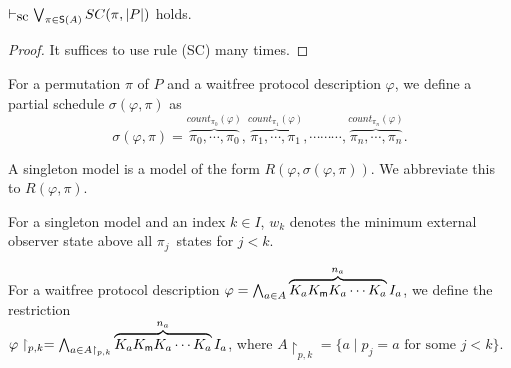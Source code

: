 \begin{lemma}
 \label{perm}
 $\vdash_{\mbox{\rm sc}} \bigvee_{\pi\in \mathsf S(A)} SC(\pi, |P|)$ holds.
\end{lemma}
\begin{proof}
 It suffices to use rule (SC) many times.
\end{proof}

\begin{definition}
 For a permutation $\pi$ of $P$ and a waitfree protocol description $\varphi$, we
 define a partial schedule $\sigma(\varphi, \pi)$ as
\[
 \sigma(\varphi, \pi) = 
 \overbrace{\pi_0, \cdots, \pi_0}^{count_{\pi_0}(\varphi)},
 \overbrace{\pi_1, \cdots, \pi_1}^{count_{\pi_1}(\varphi)},
 \cdots \cdots
 \cdots,
 \overbrace{\pi_n,\cdots, \pi_n}^{count_{\pi_n}(\varphi)}.
\]
\end{definition}

\begin{definition}
 A singleton model is a model of the form $R(\varphi, \sigma(\varphi,
 \pi))$. We abbreviate this to $R(\varphi, \pi)$.

 For a singleton model and an index $k\in I$, $w_k$ denotes the minimum external
 observer state above all $\pi_j$~states for $j< k$.
\end{definition}

\begin{definition}
 For a waitfree protocol description $\varphi = \bigwedge_{a\in A} 
 \overbrace{K_a K_{\sf m} K_a \cdots K_a}^{n_a}
 I_a$, we define the restriction \\
 $\varphi\restriction_{p,k} = 
 \bigwedge_{a\in A\restriction_{p,k}} \overbrace{K_a K_{\sf m} K_a \cdots K_a}^{n_a} I_a$,
 where $A\restriction_{p,k} = \{a\mid p_j = a \mbox{ for some
 } j<
 k\}$.
\end{definition}

